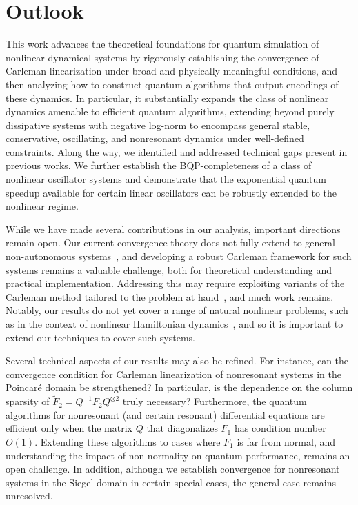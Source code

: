 \documentclass[superscriptaddress,onecolumn,nofootinbib,longbibliography,a4paper,accepted=2026-09-29]{quantumarticle}
\theoremstyle{plain}
\theoremstyle{definition}
\numberwithin{thm}{section}
\numberwithin{assumption}{section}
\numberwithin{lemma}{section}
\numberwithin{prop}{section}
\numberwithin{cor}{section}
\numberwithin{definition}{section}
\numberwithin{rmk}{section}
\numberwithin{equation}{section}
\newcommand{\lrb}[1]{\left ( #1 \right )}
\newcommand{\myO}[1]{O\lrb{#1}}
\begin{document}
\section{Outlook}
\label{sec:outlook}

This work advances the theoretical foundations for quantum simulation of nonlinear dynamical systems by rigorously establishing the convergence of Carleman linearization under broad and physically meaningful conditions, and then analyzing how to construct quantum algorithms that output encodings of these dynamics. 
In particular, it substantially expands the class of nonlinear dynamics amenable to efficient quantum algorithms, extending beyond purely dissipative systems with negative log-norm to encompass general stable, conservative, oscillating, and nonresonant dynamics under well-defined constraints. Along the way, we identified and addressed technical gaps present in previous works. We further establish the BQP-completeness of a class of nonlinear oscillator systems and demonstrate that the exponential quantum speedup available for certain linear oscillators can be robustly extended to the nonlinear regime.

While we have made several contributions in our analysis, important directions remain open. Our current convergence theory does not fully extend to general non-autonomous systems~\cite{wiggins2003introduction}, and developing a robust Carleman framework for such systems remains a valuable challenge, both for theoretical understanding and practical implementation. Addressing this may require exploiting variants of the Carleman method tailored to the problem at hand~\cite{kowalski1991nonlinear}, and much work remains. Notably, our results do not yet cover a range of natural nonlinear problems, such as in the context of nonlinear Hamiltonian dynamics~\cite{arnol2013mathematical}, and so it is important to extend our techniques to cover such systems. 

Several technical aspects of our results may also be refined. For instance, can the convergence condition for Carleman linearization of nonresonant systems in the Poincar\'{e} domain be strengthened? In particular, is the dependence on the column sparsity of $\tilde{F}_2=Q^{-1}F_2Q^{\otimes 2}$ truly necessary? Furthermore, the quantum algorithms for nonresonant (and certain resonant) differential equations are efficient only when the matrix $Q$ that diagonalizes $F_1$ has condition number $\myO{1}$. Extending these algorithms to cases where $F_1$ is far from normal, and understanding the impact of non-normality on quantum performance, remains an open challenge. In addition, although we establish convergence for nonresonant systems in the Siegel domain in certain special cases, the general case remains unresolved.
\end{document}
